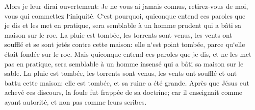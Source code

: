 \verse Alors je leur dirai ouvertement: Je ne vous ai jamais connus, retirez-vous de moi, vous qui commettez l`iniquité. 
\verse C`est pourquoi, quiconque entend ces paroles que je dis et les met en pratique, sera semblable à un homme prudent qui a bâti sa maison sur le roc. 
\verse La pluie est tombée, les torrents sont venus, les vents ont soufflé et se sont jetés contre cette maison: elle n`est point tombée, parce qu`elle était fondée sur le roc. 
\verse Mais quiconque entend ces paroles que je dis, et ne les met pas en pratique, sera semblable à un homme insensé qui a bâti sa maison sur le sable. 
\verse La pluie est tombée, les torrents sont venus, les vents ont soufflé et ont battu cette maison: elle est tombée, et sa ruine a été grande. 
\verse Après que Jésus eut achevé ces discours, la foule fut frappée de sa doctrine; 
\verse car il enseignait comme ayant autorité, et non pas comme leurs scribes. 

